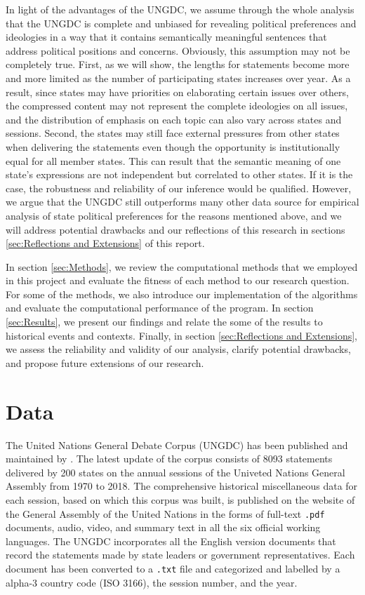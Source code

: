 \documentclass[final,authoryear,3p,12pt,times,hidelinks]{elsarticle}
\begin{document}
In light of the advantages of the UNGDC, we assume through the whole analysis that the UNGDC is complete and unbiased for revealing political preferences and ideologies in a way that it contains semantically meaningful sentences that address political positions and concerns. Obviously, this assumption may not be completely true. First, as we will show, the lengths for statements become more and more limited as the number of participating states increases over year. As a result, since states may have priorities on elaborating certain issues over others, the compressed content may not represent the complete ideologies on all issues, and the distribution of emphasis on each topic can also vary across states and sessions. Second, the states may still face external pressures from other states when delivering the statements even though the opportunity is institutionally equal for all member states. This can result that the semantic meaning of one state's expressions are not independent but correlated to other states. If it is the case, the robustness and reliability of our inference would be qualified. However, we argue that the UNGDC still outperforms many other data source for empirical analysis of state political preferences for the reasons mentioned above, and we will address potential drawbacks and our reflections of this research in sections \ref{sec:Reflections and Extensions} of this report. 

In section \ref{sec:Methods}, we review the computational methods that we employed in this project and evaluate the fitness of each method to our research question. For some of the methods, we also introduce our implementation of the algorithms and evaluate the computational performance of the program. In section \ref{sec:Results}, we present our findings and relate the some of the results to historical events and contexts. Finally, in section \ref{sec:Reflections and Extensions}, we assess the reliability and validity of our analysis, clarify potential drawbacks, and propose future extensions of our research. 

\section{Data}

The United Nations General Debate Corpus (UNGDC) has been published and maintained by \cite{DVN/0TJX8Y_2017}. The latest update of the corpus consists of 8093 statements delivered by 200 states on the annual sessions of the Univeted Nations General Assembly from 1970 to 2018. The comprehensive historical miscellaneous data for each session, based on which this corpus was built, is published on the website of the General Assembly of the United Nations in the forms of full-text \texttt{.pdf} documents, audio, video, and summary text in all the six official working languages. The UNGDC incorporates all the English version documents that record the statements made by state leaders or government representatives. Each document has been converted to a \texttt{.txt} file and categorized and labelled by a alpha-3 country code (ISO 3166), the session number, and the year. 
\end{document}
